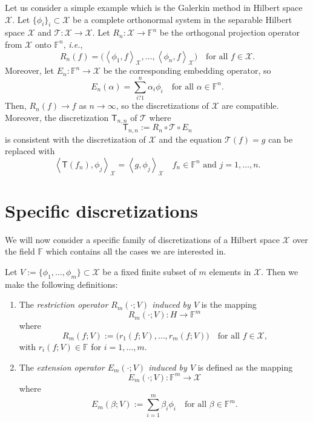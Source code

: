 \documentclass[a4paper]{paper}
\newcommand{\VecSpace}[1]{\mathscr{#1}}
\newcommand{\Field}{\mathbb{F}}
\newcommand{\Op}[1]{\mathcal{#1}}
\newcommand{\DiscOp}[1]{\mathsf{#1}}
\newcommand{\ip}[2]{\left \langle #1,#2 \right\rangle}
\newcommand{\ie}{\textsl{i.e.}\xspace}
\begin{document}
\begin{examp}
Let us consider a simple example which is the 
Galerkin method in Hilbert space $\VecSpace{X}$. Let $\{ \phi_{i} \}_{i}\subset \VecSpace{X}$ be a 
complete orthonormal system in the separable Hilbert space $\VecSpace{X}$ and 
$\Op{T} \colon \VecSpace{X} \to \VecSpace{X}$. 
Let $R_{n} \colon \VecSpace{X} \to \Field^{n}$ be the orthogonal projection operator 
from $\VecSpace{X}$ onto $\Field^{n}$, \ie,
\[ R_{n}(f)= \bigl( \ip{\phi_{1}}{f}_{\VecSpace{X}}, \ldots, \ip{\phi_{n}}{f}_{\VecSpace{X}} \bigr)
   \quad\text{for all $f\in \VecSpace{X}$.} \]
Moreover, let $E_{n}\colon \Field^{n} \to \VecSpace{X}$ be the corresponding embedding operator, so
\[ E_{n}(\alpha)= \sum_{i?1}^n \alpha_i \phi_{i}
   \quad\text{for all $\alpha\in \Field^{n}$.} \]
Then, $R_{n}(f)\to f$ as $n\to \infty$, so the discretizations of $\VecSpace{X}$ are 
compatible. Moreover, the discretization $\DiscOp{T}_{n,n}$ of $\Op{T}$ where 
\[ \DiscOp{T}_{n,n}:=R_{n}\circ \Op{T} \circ E_{n} \]
is consistent with the discretization of $\VecSpace{X}$ and the equation
$\Op{T}(f)=g$ can be replaced with 
\[ \ip{\DiscOp{T}(f_{n})}{\phi_{j}}_{\VecSpace{X}}=\ip{g}{\phi_{j}}_{\VecSpace{X}}
   \quad\text{$f_{n}\in \Field^{n}$ and $j=1,\ldots,n$.} \]
\end{examp}

\section{Specific discretizations}
We will now consider a specific family of discretizations of a Hilbert space $\VecSpace{X}$ over the 
field $\Field$ which contains all the cases we are interested in. 
\begin{definition}
  Let $V:=\{ \phi_{1},\ldots,\phi_{m} \}\subset \VecSpace{X}$ be a fixed finite subset of $m$ elements in $\VecSpace{X}$.
  Then we make the following definitions:
  \begin{enumerate}
  \item The \emph{restriction operator $R_{m}(\cdot;V)$ induced by $V$} is the  mapping  
    \[ R_{m}(\cdot;V) \colon H \to \Field^{m} \]
    where 
    \[ R_{m}(f;V):=\bigl( r_{1}(f;V),\ldots,r_{m}(f;V) \bigr) 
       \quad\text{for all $f\in \VecSpace{X}$,} \]
    with $r_{i}(f;V)\in \Field$ for $i=1,\ldots,m$.
  \item The \emph{extension operator $E_{m}(\cdot;V)$ induced by 
    $V$} is defined as the mapping  
    \[ E_{m}(\cdot;V) \colon \Field^{m} \to \VecSpace{X} \]
    where 
    \[ E_{m}(\beta;V):=  \sum_{i=1}^m \beta_i \phi_{i}
       \quad\text{for all $\beta\in \Field^{m}$.} \]      
  \end{enumerate}
\end{definition}
\end{document}
